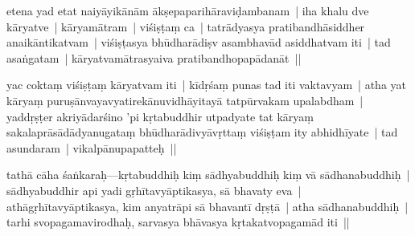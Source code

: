 \documentclass[article,12pt,a4paper]{memoir}%
\newcounter{parCount}
\begin{document}
	  
	  \pstart \leavevmode%
	\label{thakur75-51.14}etena yad etat naiyāyikānām ākṣepaparihāraviḍambanam | iha khalu dve kāryatve | kāryamātram | viśiṣṭaṃ ca | tatrādyasya pratibandhāsiddher anaikāntikatvam | viśiṣṭasya bhūdharādiṣv asambhavād asiddhatvam iti | tad asaṅgatam | kāryatvamātrasyaiva pratibandhopapādanāt ||
	{}
	\pend%
      

	  
	  \pstart \leavevmode%
	\label{thakur75-51.18}yac coktaṃ viśiṣṭaṃ kāryatvam iti | kīdṛśaṃ punas tad iti vaktavyam | atha yat kāryaṃ puruṣānvayavyatirekānuvidhāyitayā tatpūrvakam upalabdham | yaddṛṣṭer akriyādarśino 'pi kṛtabuddhir utpadyate tat kāryaṃ sakalaprāsādādyanugataṃ bhūdharādivyāvṛttaṃ viśiṣṭam ity abhidhīyate | tad asundaram | vikalpānupapatteḥ ||
	{}
	\pend%
      

	  
	  \pstart \leavevmode%
	\label{thakur75-51.22}\label{sarit__ratnakīrtinibandhāvali__139880}tathā cāha śaṅkaraḥ—kṛtabuddhiḥ kiṃ sādhyabuddhiḥ kiṃ vā sādhanabuddhiḥ | sādhyabuddhir api yadi gṛhītavyāptikasya, sā bhavaty eva | athāgṛhītavyāptikasya, kim anyatrāpi sā bhavantī dṛṣṭā | atha sādhanabuddhiḥ | tarhi svopagamavirodhaḥ, sarvasya bhāvasya kṛtakatvopagamād iti ||\label{sarit__ratnakīrtinibandhāvali__140214}
	{}
	\pend%
      
\end{document}

